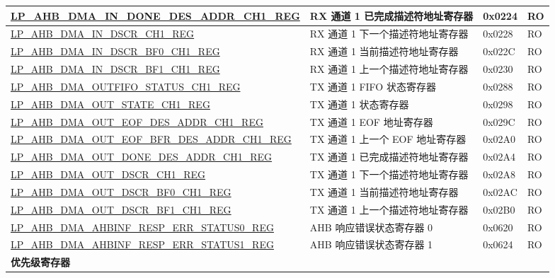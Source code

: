 \begin{longtable}{ | l | l | p{1.3cm} | l | }
\hyperref[regdesc:LPAHBDMAINDONEDESADDRCHNREG]{LP\_AHB\_DMA\_IN\_DONE\_DES\_ADDR\_CH1\_REG} & RX 通道 1 已完成描述符地址寄存器 & 0x0224 & RO \\ \hline
\hyperref[regdesc:LPAHBDMAINDSCRCHNREG]{LP\_AHB\_DMA\_IN\_DSCR\_CH1\_REG} & RX 通道 1 下一个描述符地址寄存器 & 0x0228 & RO \\ \hline
\hyperref[regdesc:LPAHBDMAINDSCRBF0CHNREG]{LP\_AHB\_DMA\_IN\_DSCR\_BF0\_CH1\_REG} & RX 通道 1 当前描述符地址寄存器 & 0x022C & RO \\ \hline
\hyperref[regdesc:LPAHBDMAINDSCRBF1CHNREG]{LP\_AHB\_DMA\_IN\_DSCR\_BF1\_CH1\_REG} & RX 通道 1 上一个描述符地址寄存器 & 0x0230 & RO \\ \hline
\hyperref[regdesc:LPAHBDMAOUTFIFOSTATUSCHNREG]{LP\_AHB\_DMA\_OUTFIFO\_STATUS\_CH1\_REG} & TX 通道 1 FIFO 状态寄存器 & 0x0288 & RO \\ \hline
\hyperref[regdesc:LPAHBDMAOUTSTATECHNREG]{LP\_AHB\_DMA\_OUT\_STATE\_CH1\_REG} & TX 通道 1 状态寄存器 & 0x0298 & RO \\ \hline
\hyperref[regdesc:LPAHBDMAOUTEOFDESADDRCHNREG]{LP\_AHB\_DMA\_OUT\_EOF\_DES\_ADDR\_CH1\_REG} & TX 通道 1 EOF 地址寄存器 & 0x029C & RO \\ \hline
\hyperref[regdesc:LPAHBDMAOUTEOFBFRDESADDRCHNREG]{LP\_AHB\_DMA\_OUT\_EOF\_BFR\_DES\_ADDR\_CH1\_REG} & TX 通道 1 上一个 EOF 地址寄存器 & 0x02A0 & RO \\ \hline
\hyperref[regdesc:LPAHBDMAOUTDONEDESADDRCHNREG]{LP\_AHB\_DMA\_OUT\_DONE\_DES\_ADDR\_CH1\_REG} & TX 通道 1 已完成描述符地址寄存器 & 0x02A4 & RO \\ \hline
\hyperref[regdesc:LPAHBDMAOUTDSCRCHNREG]{LP\_AHB\_DMA\_OUT\_DSCR\_CH1\_REG} & TX 通道 1 下一个描述符地址寄存器 & 0x02A8 & RO \\ \hline
\hyperref[regdesc:LPAHBDMAOUTDSCRBF0CHNREG]{LP\_AHB\_DMA\_OUT\_DSCR\_BF0\_CH1\_REG} & TX 通道 1 当前描述符地址寄存器 & 0x02AC & RO \\ \hline
\hyperref[regdesc:LPAHBDMAOUTDSCRBF1CHNREG]{LP\_AHB\_DMA\_OUT\_DSCR\_BF1\_CH1\_REG} & TX 通道 1 上一个描述符地址寄存器 & 0x02B0 & RO \\ \hline
\hyperref[regdesc:LPAHBDMAAHBINFRESPERRSTATUS0REG]{LP\_AHB\_DMA\_AHBINF\_RESP\_ERR\_STATUS0\_REG} & AHB 响应错误状态寄存器 0 & 0x0620 & RO \\ \hline
\hyperref[regdesc:LPAHBDMAAHBINFRESPERRSTATUS1REG]{LP\_AHB\_DMA\_AHBINF\_RESP\_ERR\_STATUS1\_REG} & AHB 响应错误状态寄存器 1 & 0x0624 & RO \\ \hline
\multicolumn{4}{|l|}{\textbf{优先级寄存器}} \\ \hline

\end{longtable}
